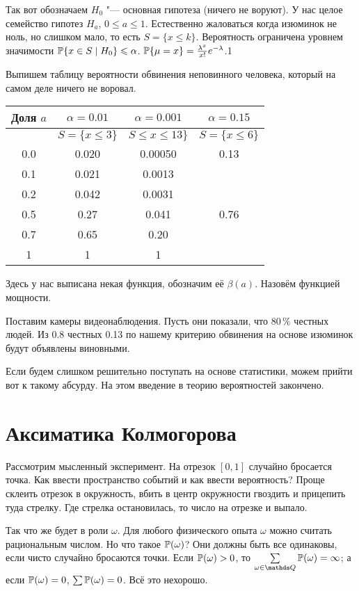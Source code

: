 Так вот обозначаем $H_0$  "--- основная гипотеза (ничего не воруют). У нас целое семейство гипотез $H_a$, $0\le a\le 1$. Естественно жаловаться когда изюминок не ноль, но слишком мало, то есть $S = \{x\le k\}$. Вероятность ограничена уровнем значимости $\P\{x\in S\mid H_0\}\le \alpha$. $\P\{\mu = x\} = \frac{\lambda^x}{x!}e^{-\lambda}$.1

Выпишем таблицу вероятности обвинения неповинного человека, который на самом деле ничего не воровал.

\begin{tabular}[H]{|c|c|c|c|}
\hline 
Доля $a$ & $\alpha=0.01$ & $\alpha=0.001$& $\alpha = 0.15$\\\hline
 & $S=\{x\le 3\}$& $S \le x\le 13\} $ & $S = \{x\le 6\}$  \\\hline
 0.0 & 0.020 & 0.00050 & 0.13 \\\hline
 0.1 & 0.021 & 0.0013  & \\\hline
 0.2 & 0.042 & 0.0031  & \\\hline
 0.5 & 0.27  & 0.041   & 0.76 \\\hline
 0.7 & 0.65  & 0.20 & \\\hline
 1   & 1     &  1 &  \\\hline
\end{tabular}

Здесь у нас выписана некая функция, обозначим её $\beta(a)$. Назовём функцией мощности.

Поставим камеры видеонаблюдения. Пусть они показали, что $80\,\%$ честных людей.  Из 0.8 честных 0.13 по нашему критерию обвинения на основе изюминок будут объявлены виновными.

Если будем слишком решительно поступать на основе статистики, можем прийти вот к такому абсурду. На этом введение в теорию вероятностей закончено.

\section{Аксиматика Колмогорова}

Рассмотрим мысленный эксперимент. На отрезок $[0,1]$ случайно бросается точка. Как ввести пространство событий и как ввести вероятность? Проще склеить отрезок в окружность, вбить в центр окружности гвоздить и прицепить туда стрелку. Где стрелка остановилась, то число на отрезке и выпало.

Так что же будет в роли $\omega$. Для любого физического опыта $\omega$ можно считать рациональным числом. Но что такое $\P(\omega)$? Они должны быть все одинаковы, если чисто случайно бросаются точки. Если $\P(\omega)>0$, то $\sum\limits_{\omega\in\Q}\P(\omega) = \infty$; а если $\P(\omega) = 0$, $\sum \P(\omega) = 0$. Всё это нехорошо.

